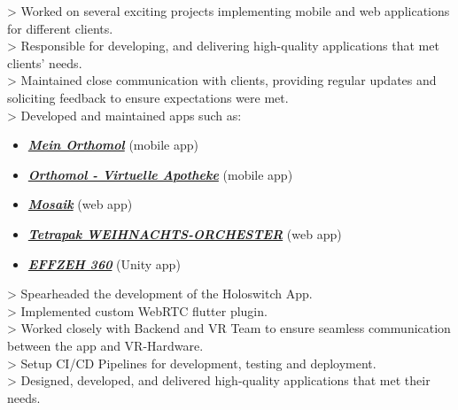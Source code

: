 \documentclass[10pt,a4paper,normalphoto]{altacv}
\begin{document}
\begin{fullwidth}
> Worked on several exciting projects implementing mobile and web applications for different clients.\\
> Responsible for developing, and delivering high-quality applications that met clients' needs.\\
> Maintained close communication with clients, providing regular updates and soliciting feedback to ensure expectations were met.\\
\vspace{1em}
> Developed and maintained apps such as:
\vspace{.5em}
\begin{itemize}
    \item \href{https://bit.ly/3tEGnTf}{\textit{\textbf{Mein Orthomol}}} (mobile app)
    \item \href{https://bit.ly/3DfgH2S}{\textit{\textbf{Orthomol - Virtuelle Apotheke}}} (mobile app)
    \item \href{https://tetra-pak-mosaik.web.app/}{\textit{\textbf{Mosaik}}} (web app)
    \item \href{https://tetrapak-dabf7.web.app/}{\textit{\textbf{Tetrapak WEIHNACHTS-ORCHESTER}}} (web app)
    \item \href{https://bit.ly/3DcJzJ5}{\textit{\textbf{EFFZEH 360}}} (Unity app)
\end{itemize}

\vspace{1em}


\newpage


> Spearheaded the development of the Holoswitch App.\\
> Implemented custom WebRTC flutter plugin.\\
> Worked closely with Backend and VR Team to ensure seamless communication between the app and VR-Hardware.\\
> Setup CI/CD Pipelines for development, testing and deployment.\\
> Designed, developed, and delivered high-quality applications that met their needs.


\end{fullwidth}
\end{document}
